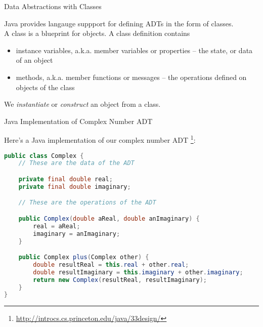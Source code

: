 \documentclass{beamer}
\begin{document}
\begin{frame}{Data Abstractions with Classes}

Java provides langauge suppport for defining ADTs in the form of classes.\\

A class is a blueprint for objects.  A class definition contains
\begin{itemize}
\item instance variables, a.k.a. member variables or properties -- the state, or data of an object
\item methods, a.k.a. member functions or messages -- the operations defined on objects of the class
\end{itemize}
We {\em instantiate} or {\em construct} an object from a class.
\end{frame}


\begin{frame}[fragile]{Java Implementation of Complex Number ADT}


Here's a Java implementation of our complex number ADT \footnote{\url{http://introcs.cs.princeton.edu/java/33design/}}:
\vspace{-.1in}
\begin{lstlisting}[language=Java]
public class Complex {
    // These are the data of the ADT

    private final double real;
    private final double imaginary;

    // These are the operations of the ADT

    public Complex(double aReal, double anImaginary) {
        real = aReal;
        imaginary = anImaginary;
    }

    public Complex plus(Complex other) {
        double resultReal = this.real + other.real;
        double resultImaginary = this.imaginary + other.imaginary;
        return new Complex(resultReal, resultImaginary);
    }
}
\end{lstlisting}


\end{frame}
\end{document}
